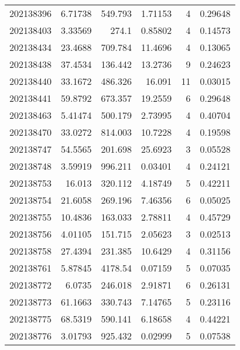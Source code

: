 \begin{tabular}{rrrrrr}
 202138396 &          6.71738 &      549.793  &            1.71153 &           4 & 0.29648 \\
 202138403 &          3.33569 &      274.1    &            0.85802 &           4 & 0.14573 \\
 202138434 &         23.4688  &      709.784  &           11.4696  &           4 & 0.13065 \\
 202138438 &         37.4534  &      136.442  &           13.2736  &           9 & 0.24623 \\
 202138440 &         33.1672  &      486.326  &           16.091   &          11 & 0.03015 \\
 202138441 &         59.8792  &      673.357  &           19.2559  &           6 & 0.29648 \\
 202138463 &          5.41474 &      500.179  &            2.73995 &           4 & 0.40704 \\
 202138470 &         33.0272  &      814.003  &           10.7228  &           4 & 0.19598 \\
 202138747 &         54.5565  &      201.698  &           25.6923  &           3 & 0.05528 \\
 202138748 &          3.59919 &      996.211  &            0.03401 &           4 & 0.24121 \\
 202138753 &         16.013   &      320.112  &            4.18749 &           5 & 0.42211 \\
 202138754 &         21.6058  &      269.196  &            7.46356 &           6 & 0.05025 \\
 202138755 &         10.4836  &      163.033  &            2.78811 &           4 & 0.45729 \\
 202138756 &          4.01105 &      151.715  &            2.05623 &           3 & 0.02513 \\
 202138758 &         27.4394  &      231.385  &           10.6429  &           4 & 0.31156 \\
 202138761 &          5.87845 &     4178.54   &            0.07159 &           5 & 0.07035 \\
 202138772 &          6.0735  &      246.018  &            2.91871 &           6 & 0.26131 \\
 202138773 &         61.1663  &      330.743  &            7.14765 &           5 & 0.23116 \\
 202138775 &         68.5319  &      590.141  &            6.18658 &           4 & 0.44221 \\
 202138776 &          3.01793 &      925.432  &            0.02999 &           5 & 0.07538 \\

\end{tabular}
